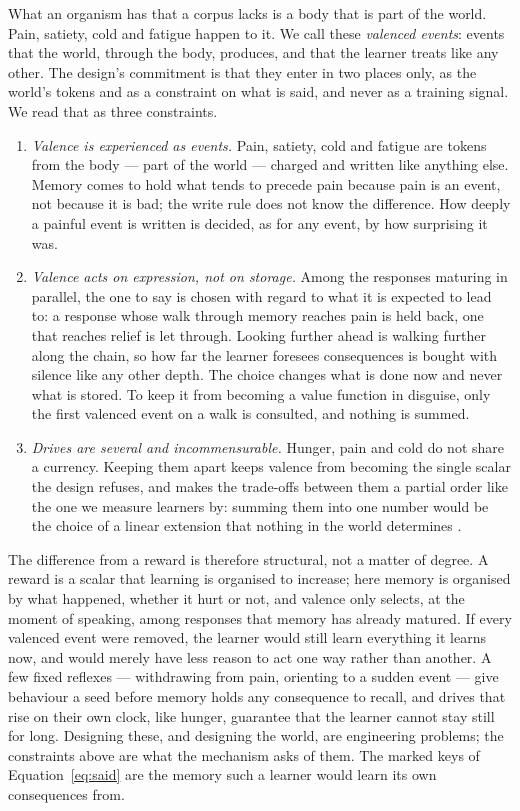 \documentclass[11pt,a4paper]{article}
\theoremstyle{plain}
\theoremstyle{definition}
\theoremstyle{remark}
\begin{document}
What an organism has that a corpus lacks is a body that is part of the world.
Pain, satiety, cold and fatigue happen to it. We call these \emph{valenced
events}: events that the world, through the body, produces, and that the
learner treats like any other. The design's commitment is that they enter in two
places only, as the world's tokens and as a constraint on what is said, and
never as a training signal. We read that as three constraints.
\begin{enumerate}
\item \emph{Valence is experienced as events.} Pain, satiety, cold and fatigue
are tokens from the body --- part of the world --- charged and written like
anything else. Memory comes to hold what tends to precede pain because pain is
an event, not because it is bad; the write rule does not know the difference.
How deeply a painful event is written is decided, as for any event, by how
surprising it was.
\item \emph{Valence acts on expression, not on storage.} Among the responses
maturing in parallel, the one to say is chosen with regard to what it is
expected to lead to: a response whose walk through memory reaches pain is held
back, one that reaches relief is let through. Looking further ahead is walking
further along the chain, so how far the learner foresees consequences is bought
with silence like any other depth. The choice changes what is done now and
never what is stored. To keep it from becoming a value function in disguise,
only the first valenced event on a walk is consulted, and nothing is summed.
\item \emph{Drives are several and incommensurable.} Hunger, pain and cold do
not share a currency. Keeping them apart keeps valence from becoming the single
scalar the design refuses, and makes the trade-offs between them a partial
order like the one we measure learners by: summing them into one number would be
the choice of a linear extension that nothing in the world determines
\citep{yang2026gluing}.
\end{enumerate}
The difference from a reward is therefore structural, not a matter of degree. A
reward is a scalar that learning is organised to increase; here memory is
organised by what happened, whether it hurt or not, and valence only selects,
at the moment of speaking, among responses that memory has already matured. If
every valenced event were removed, the learner would still learn everything it
learns now, and would merely have less reason to act one way rather than
another.
A few fixed reflexes --- withdrawing from pain, orienting to a sudden event ---
give behaviour a seed before memory holds any consequence to recall, and drives
that rise on their own clock, like hunger, guarantee that the learner cannot
stay still for long. Designing these, and designing the world, are engineering
problems; the constraints above are what the mechanism asks of them. The
marked keys of Equation~\eqref{eq:said} are the memory such a learner would
learn its own consequences from.
\end{document}
